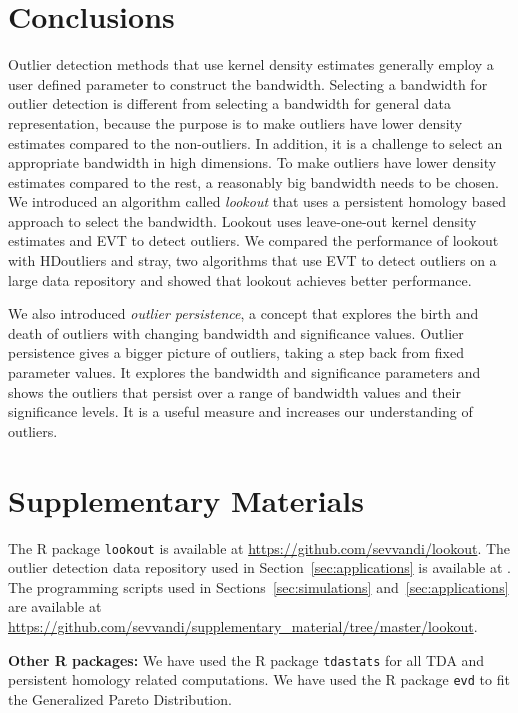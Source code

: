 \documentclass[letter,12pt]{article}
\begin{document}
\section{Conclusions}\label{sec:conclusions}
Outlier detection methods that use kernel density estimates generally employ a user defined parameter to construct the bandwidth. Selecting a bandwidth for outlier detection is different from selecting a bandwidth for general data representation, because the purpose is to make outliers have lower density estimates compared to the non-outliers. In addition, it is a challenge to select an appropriate bandwidth in high dimensions. To make outliers have lower density estimates compared to the rest, a reasonably big bandwidth needs to be chosen. We introduced an algorithm called \textit{lookout} that uses a persistent homology based approach to select the bandwidth. Lookout uses leave-one-out kernel density estimates and EVT to detect outliers. We compared the performance of lookout with HDoutliers and stray, two algorithms that use EVT to detect outliers on a large data repository and showed that lookout achieves better performance. 


We also introduced \textit{outlier persistence}, a concept that explores the birth and death of outliers with changing bandwidth and significance values.  Outlier persistence gives a bigger picture of outliers, taking a step back from fixed parameter values. It explores the bandwidth and significance parameters and shows the outliers that persist over a range of bandwidth values and their significance levels. It is a useful measure and increases our understanding of outliers.  %



\section{Supplementary Materials}\label{sec:suppmat}
The R package \texttt{lookout} is available at  \url{https://github.com/sevvandi/lookout}. 
The outlier detection data repository used in Section~\ref{sec:applications} is available at \cite{datasets}. %
The programming scripts used in Sections~\ref{sec:simulations} and~\ref{sec:applications}  are available at \\ \url{https://github.com/sevvandi/supplementary_material/tree/master/lookout}. 

\textbf{Other R packages:} We have used the R package \texttt{tdastats} \citep{tdastatsR} for all TDA and persistent homology related computations. We have used the R package \texttt{evd} \citep{evdR} to fit the Generalized Pareto Distribution. 

 
\end{document}
